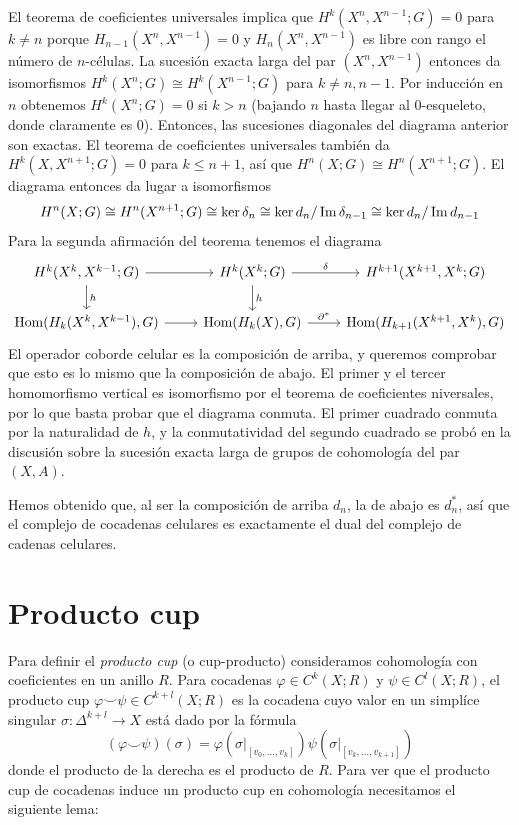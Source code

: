 \documentclass[TA.tex]{subfiles}
\begin{document}
\begin{dem}
El teorema de coeficientes universales implica que $H^k(X^n,X^{n-1};G)=0$ para $k\neq n$ porque $H_{n-1}(X^n,X^{n-1})=0$ y $H_n(X^n,X^{n-1})$ es libre con rango el número de $n$-células. La sucesión exacta larga del par $(X^n,X^{n-1})$ entonces da isomorfismos $H^k(X^n;G)\cong H^k(X^{n-1};G)$ para $k\neq n,n-1$. Por inducción en $n$ obtenemos $H^k(X^n;G)=0$ si $k>n$ (bajando $n$ hasta llegar al 0-esqueleto, donde claramente es 0). Entonces, las sucesiones diagonales del diagrama anterior son exactas. El teorema de coeficientes universales también da $H^k(X,X^{n+1};G)=0$ para $k\leq n+1$, así que $H^n(X;G)\cong H^n(X^{n+1};G)$. El diagrama entonces da lugar a isomorfismos
\[
H^n(X;G)\cong H^n(X^{n+1};G)\cong\ker\delta_n\cong\ker d_n/\operatorname{Im}\delta_{n-1}\cong\ker d_n/\operatorname{Im} d_{n-1}
\]
Para la segunda afirmación del teorema tenemos el diagrama
\[
\begin{tikzcd}
H^k(X^k,X^{k-1};G)\arrow[r]\arrow[d, "h"] & H^k(X^k;G)\arrow[r, "\delta"]\arrow[d, "h"] & H^{k+1}(X^{k+1},X^k;G)\\
\Hom(H_k(X^k,X^{k-1}),G)\arrow[r] & \Hom(H_k(X),G)\arrow[r, "\partial^*"] & \Hom(H_{k+1}(X^{k+1}, X^k),G)
\end{tikzcd}
\]
El operador coborde celular es la composición de arriba, y queremos comprobar que esto es lo mismo que la composición de abajo. El primer y el tercer homomorfismo vertical es isomorfismo por el teorema de coeficientes niversales, por lo que basta probar que el diagrama conmuta. El primer cuadrado conmuta por la naturalidad de $h$, y la conmutatividad del segundo cuadrado se probó en la discusión sobre la sucesión exacta larga de grupos de cohomología del par $(X,A)$. 

Hemos obtenido que, al ser la composición de arriba $d_n$, la de abajo es $d_n^*$, así que el complejo de cocadenas celulares es exactamente el dual del complejo de cadenas celulares. 
\end{dem}

\section{Producto cup}

Para definir el \emph{producto cup} (o cup-producto) consideramos cohomología con coeficientes en un anillo $R$. Para cocadenas $\varphi\in C^k(X;R)$ y $\psi\in C^l(X;R)$, el producto cup $\varphi\smile\psi\in C^{k+l}(X;R)$ es la cocadena cuyo valor en un simplíce singular $\sigma:\Delta^{k+l}\to X$ está dado por la fórmula
\[
(\varphi\smile\psi)(\sigma)=\varphi(\sigma|_{[v_0,\dots, v_k]})\psi(\sigma|_{[v_k,\dots, v_{k+1}]})
\]
donde el producto de la derecha es el producto de $R$. Para ver que el producto cup de cocadenas induce un producto cup en cohomología necesitamos el siguiente lema:
\end{document}
